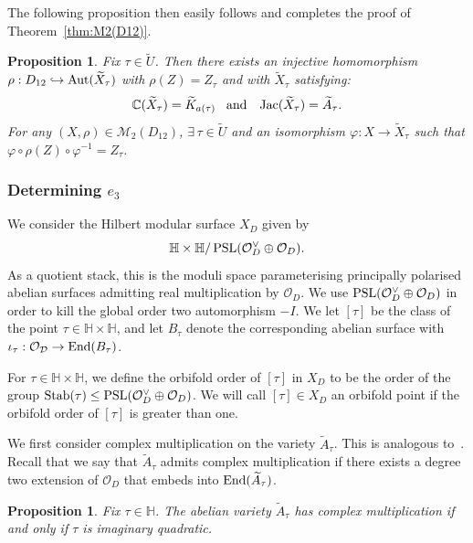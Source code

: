\documentclass[a4paper,11pt]{amsart}
\numberwithin{equation}{section}
\numberwithin{figure}{section}
\numberwithin{table}{section}
\newtheorem{proposition}[theorem]{Proposition}
\newcommand{\C}{\mathbb{C}}
\DeclareMathOperator{\PSL}{{\rm{PSL}}}
\DeclareMathOperator{\End}{{\rm{End}}}
\DeclareMathOperator{\Aut}{{\rm{Aut}}}
\DeclareMathOperator{\Jac}{{\rm{Jac}}}
\begin{document}
The following proposition then easily follows and completes the proof of Theorem~\ref{thm:M2(D12)}.

\begin{proposition}
    Fix $\tau\in\widetilde{U}$. Then there exists an injective homomorphism $\rho:D_{12}\hookrightarrow\Aut(\widetilde{X}_{\tau})$ with $\rho(Z) = Z_{\tau}$ and with $\widetilde{X}_{\tau}$ satisfying:
    \[\C(\widetilde{X}_{\tau}) = \widetilde{K}_{a(\tau)}\,\,\,\,\,\text{and}\,\,\,\,\,\Jac(\widetilde{X}_{\tau}) = \widetilde{A}_{\tau}.\]
    For any $(X,\rho)\in\mathcal{M}_{2}(D_{12})$, $\exists\,\tau\in\widetilde{U}$ and an isomorphism $\varphi:X\to\widetilde{X}_{\tau}$ such that $\varphi\circ\rho(Z)\circ\varphi^{-1} = Z_{\tau}$.
\end{proposition}

\subsubsection{Determining $e_{3}$}

We consider the Hilbert modular surface $X_{D}$ given by
\[\mathbb{H}\times\mathbb{H}/\PSL(\mathcal{O}_{D}^{\vee}\oplus\mathcal{O}_{D}).\]
As a quotient stack, this is the moduli space parameterising principally polarised abelian surfaces admitting real multiplication by $\mathcal{O}_{D}$. We use $\PSL(\mathcal{O}_{D}^{\vee}\oplus\mathcal{O}_{D})$ in order to kill the global order two automorphism $-I$. We let $[\tau]$ be the class of the point $\tau\in\mathbb{H}\times\mathbb{H}$, and let $B_{\tau}$ denote the corresponding abelian surface with $\iota_{\tau}:\mathcal{O_{D}}\to\End(B_{\tau})$.

For $\tau\in\mathbb{H}\times\mathbb{H}$, we define the orbifold order of $[\tau]$ in $X_D$ to be the order of the group ${\rm Stab}(\tau)\leq\PSL(\mathcal{O}_{D}^{\vee}\oplus\mathcal{O}_{D})$. We will call $[\tau]\in X_D$ an orbifold point if the orbifold order of $[\tau]$ is greater than one.

We first consider complex multiplication on the variety $\widetilde{A}_{\tau}$. This is analogous to~\cite[Proposition 3.2]{Muk}. Recall that we say that $\widetilde{A}_{\tau}$ admits complex multiplication if there exists a degree two extension of $\mathcal{O}_{D}$ that embeds into $\End(\widetilde{A}_{\tau})$.

\begin{proposition}\label{prop:CM}
    Fix $\tau\in\mathbb{H}$. The abelian variety $\widetilde{A}_{\tau}$ has complex multiplication if and only if $\tau$ is imaginary quadratic.
\end{proposition}
\end{document}

